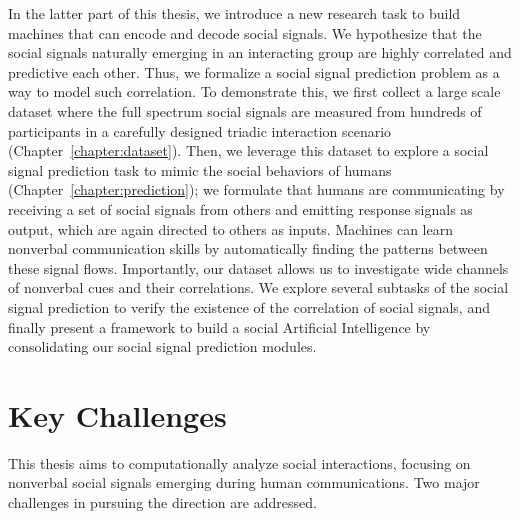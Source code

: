 In the latter part of this thesis, we introduce a new research task to build machines that can encode and decode social signals. We hypothesize that the social signals naturally emerging in an interacting group are highly correlated and predictive each other. Thus, we formalize a social signal prediction problem as a way to model such correlation. To demonstrate this, we first collect a large scale dataset where the full spectrum social signals are measured from hundreds of participants in a carefully designed triadic interaction scenario (Chapter~\ref{chapter:dataset}). Then, we leverage this dataset to explore a social signal prediction task to mimic the social behaviors of humans (Chapter~\ref{chapter:prediction}); we formulate that humans are communicating by receiving a set of social signals from others and emitting response signals as output, which are again directed to others as inputs. Machines can learn nonverbal communication skills by automatically finding the patterns between these signal flows. Importantly, our dataset allows us to investigate wide channels of nonverbal cues and their correlations. We explore several subtasks of the social signal prediction to verify the existence of the correlation of social signals, and finally present a framework to build a social Artificial Intelligence by consolidating our social signal prediction modules. 


\section{Key Challenges}
This thesis aims to computationally analyze social interactions, focusing on nonverbal social signals emerging during human communications. Two major challenges in pursuing the direction are addressed.

